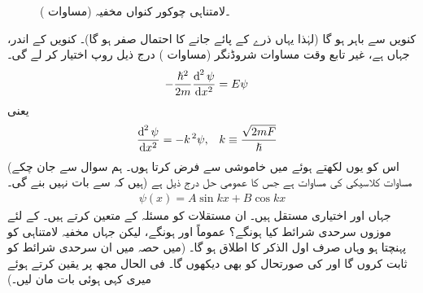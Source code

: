 \begin{figure}
\centering
{}
\caption{۔لامتناہی چوکور کنواں مخفیہ (مساوات )}
\label{شکل_غیر_تابع_لامتناہی_چکور_کنواں_مخفیہ}
\end{figure}
کنویں سے باہر  ہو گا (لہٰذا یہاں ذرے کے پائے جانے کا احتمال صفر ہو گا)۔ کنویں کے اندر، جہاں  ہے، غیر تابع وقت مساوات شروڈنگر (مساوات ) درج ذیل روپ اختیار کر لے گی۔
\begin{align}
-\frac{\hslash^{2}}{2m}\frac{\dif^{\,2}\psi}{\dif x^{2}}&=E\psi
\end{align} 
یعنی
\begin{align}\label{مساوات_شروڈنگر_کلاسیکی_ہارمونی_مرتعش}
\frac{\dif^{\,2}\psi}{\dif x^{2}}&=-k^{\,2}\psi, && k\equiv \frac{\sqrt{2mF}}{\hslash}
\end{align}
(اس کو یوں لکھتے ہوئے میں خاموشی سے    فرض کرتا ہوں۔ ہم سوال  سے جان چکے  ہیں کہ  سے بات نہیں بنے گی۔) مساوات  کلاسیکی  کی مساوات ہے جس کا عمومی حل درج ذیل  ہے
\begin{align}
\psi(x)=A\sin kx+B\cos kx
\end{align}
 جہاں  اور  اختیاری مستقل ہیں۔ ان مستقلات کو مسئلہ کے متعین کرتے ہیں۔  کے لئے  موزوں سرحدی شرائط کیا ہونگے؟ عموماً  اور   ہونگے، لیکن جہاں مخفیہ لامتناہی کو پہنچتا ہو وہاں صرف اول الذکر کا اطلاق ہو گا۔ (میں حصہ میں ان سرحدی شرائط کو ثابت کروں گا اور  کی صورتحال کو بھی دیکھوں گا۔ فی الحال مجھ پر یقین کرتے ہوئے میری کہی ہوئی بات مان لیں۔) 

